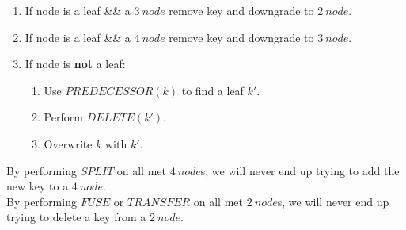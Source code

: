 \documentclass[11pt,a4paper]{article}
\begin{document}
\begin{enumerate}[label=\roman*)]
\begin{enumerate}
	  \item If node is a leaf \&\& a $3\ node$ remove key and downgrade to $2\ node$.
	  \item If node is a leaf \&\& a $4\ node$ remove key and downgrade to $3\ node$.
	  \item If node is \textbf{not} a leaf:
	  \begin{enumerate}
    	\item Use $PREDECESSOR(k)$ to find a leaf $k'$.
	    \item Perform $DELETE(k')$.
	    \item Overwrite $k$ with $k'$.
	  \end{enumerate}
	\end{enumerate}
\end{enumerate}
\nb By performing $SPLIT$ on all met $4\ node$s, we will never end up trying to add the new key to a $4\ node$.\\
\nb By performing $FUSE$ or $TRANSFER$ on all met $2\ node$s, we will never end up trying to delete a key from a $2\ node$.\\
\end{document}
